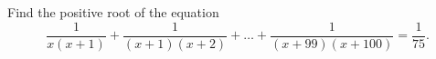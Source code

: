 Find the positive root of the equation \[\dfrac{1}{x(x+1)}+\dfrac{1}{(x+1)(x+2)}+\ldots+\dfrac{1}{(x+99)(x+100)}=\dfrac{1}{75}.\]
